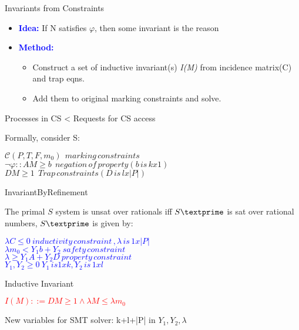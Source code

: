 \documentclass{beamer}
\begin{document}
\begin{frame}{Invariants from Constraints}
\begin{itemize}
  \item \textcolor{blue}{\textbf{Idea:}} If N satisfies $\varphi$, then some invariant is the reason
  \item \textcolor{blue}{\textbf{Method:}} 
  \begin{itemize}
    \item Construct a set of inductive invariant(s) \textit{I(M)} from incidence matrix(C) and trap eqns.
    \item Add them to original marking constraints and solve.
  \end{itemize}
\end{itemize}
\begin{example}
  \begin{center}
  Processes in CS < Requests for CS access
  \end{center}
\end{example}
Formally, consider S:\\
\begin{center}
$\mathcal{C}(P,T,F,m_0) \:\: marking\, constraints$\\
$\neg\varphi :: AM \geq b \:\: negation\,of\,property (b\,is\,kx1)$\\
$DM \geq 1 \:\:     Trap\,constraints(D\,is\,lx|P|)$
\end{center}

\end{frame}


\begin{frame}{InvariantByRefinement}
\begin{Theorem}
  The primal $S$ system is unsat over rationals iff $S\textprime$ is sat over rational numbers, $S\textprime$ is given by:
\begin{center}
  \textcolor{blue}{
$  \lambda C \leq 0   \: inductivity\,constraint\,,\lambda\,is\,1x|P|$\\
$ \lambda m_0 < Y_1b+Y_2 \: safety\,constraint$\\
$  \lambda \geq Y_1A + Y_2D \: property\,constraint$\\
$ Y_1,Y_2\geq 0 \: Y_1\,is1xk, Y_2\,is\,1xl $}
\end{center}
  
\end{Theorem}
\begin{block}{Inductive Invariant}
  \begin{center}
    \textcolor{red}{$I(M)::= DM\geq 1 \land \lambda M \leq \lambda m_0$}
  \end{center}
\end{block}
New variables for SMT solver: k+l+|P| in $Y_1, Y_2, \lambda$
\end{frame}
\end{document}
